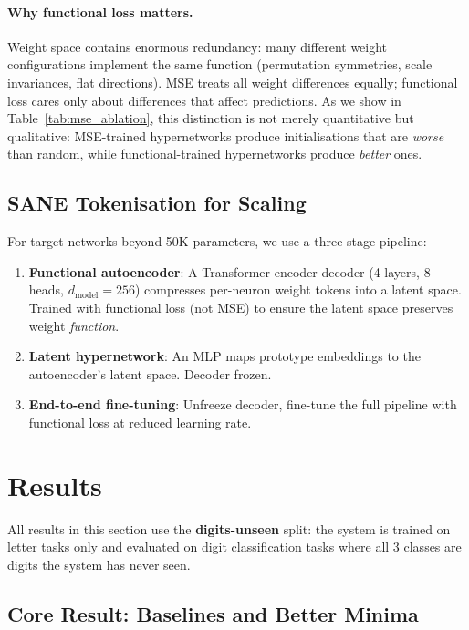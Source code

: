 \documentclass[11pt,a4paper]{article}
\begin{document}
\paragraph{Why functional loss matters.} Weight space contains enormous redundancy: many different weight configurations implement the same function (permutation symmetries, scale invariances, flat directions). MSE treats all weight differences equally; functional loss cares only about differences that affect predictions. As we show in Table~\ref{tab:mse_ablation}, this distinction is not merely quantitative but qualitative: MSE-trained hypernetworks produce initialisations that are \emph{worse} than random, while functional-trained hypernetworks produce \emph{better} ones.

\subsection{SANE Tokenisation for Scaling}
\label{sec:sane}

For target networks beyond 50K parameters, we use a three-stage pipeline:
\begin{enumerate}[noitemsep]
    \item \textbf{Functional autoencoder}: A Transformer encoder-decoder (4 layers, 8 heads, $d_{\text{model}} = 256$) compresses per-neuron weight tokens into a latent space. Trained with functional loss (not MSE) to ensure the latent space preserves weight \emph{function}.
    \item \textbf{Latent hypernetwork}: An MLP maps prototype embeddings to the autoencoder's latent space. Decoder frozen.
    \item \textbf{End-to-end fine-tuning}: Unfreeze decoder, fine-tune the full pipeline with functional loss at reduced learning rate.
\end{enumerate}

\section{Results}
\label{sec:results}

All results in this section use the \textbf{digits-unseen} split: the system is trained on letter tasks only and evaluated on digit classification tasks where all 3 classes are digits the system has never seen.

\subsection{Core Result: Baselines and Better Minima}
\end{document}
